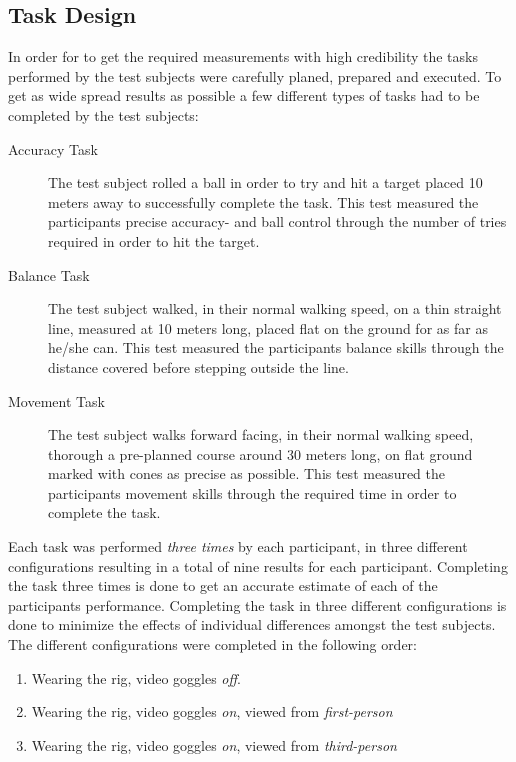 \documentclass[runningheads,a4paper,oribibl]{llncs}
\begin{document}
\subsection{Task Design} \label{subsec:TaskDesign}

In order for to get the required measurements with high credibility the tasks performed by the test subjects were carefully planed, prepared and executed. To get as wide spread results as possible a few different types of tasks had to be completed by the test subjects:
\begin{description}
   \item[Accuracy Task] The test subject rolled a ball in order to try and hit a target placed 10 meters away to successfully complete the task. This test measured the participants precise accuracy- and ball control through the number of tries required in order to hit the target.
   \item[Balance Task] The test subject walked, in their normal walking speed, on a thin straight line, measured at 10 meters long, placed flat on the ground for as far as he/she can. This test measured the participants balance skills through the distance covered before stepping outside the line.
   \item[Movement Task] The test subject walks forward facing, in their normal walking speed, thorough a pre-planned course around 30 meters long, on flat ground marked with cones as precise as possible. This test measured the participants movement skills through the required time in order to complete the task.
\end{description}

Each task was performed \emph{three times} by each participant, in three different configurations resulting in a total of nine results for each participant. Completing the task three times is done to get an accurate estimate of each of the participants performance. Completing the task in three different configurations is done to minimize the effects of individual differences amongst the test subjects. The different configurations were completed in the following order:
\begin{enumerate}
	\item Wearing the rig, video goggles \emph{off}.
	\item Wearing the rig, video goggles \emph{on}, viewed from \emph{first-person}
	\item Wearing the rig, video goggles \emph{on}, viewed from \emph{third-person}
\end{enumerate}
\end{document}
